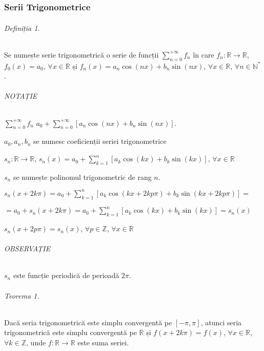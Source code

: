 \part{}
\section{Serii Trigonometrice}
\paragraph{Definiția 1.}
Se numește serie trigonometrică o serie de funcții $\displaystyle\sum_{n=0}^{+\infty}f_{n}$ în care $f_{n}: \mathbb{R} \rightarrow \mathbb{R}$, $f_{0}(x) = a_{0}$, $\forall x \in \mathbb{R}$ și
$f_{n}(x) = a_{n} \cos(nx) + b_{n} \sin(nx)$, $\forall x \in \mathbb{R}$, $\forall n \in \mathbb{N}^{*}$.

\paragraph{NOTAȚIE}
$\displaystyle\sum_{n=0}^{+\infty}f_{n}$  $a_{0} + \displaystyle\sum_{n=0}^{+\infty}[a_{n}\cos(nx) + b_{n}\sin(nx)]$.

$a_{0}, a_{n}, b_{n}$ se numesc coeficienții seriei trigonometrice

$s_{n}:\mathbb{R} \rightarrow \mathbb{R}$, $s_{n}(x) = a_{0} + \displaystyle\sum_{k=1}^{n}[a_{k}\cos(kx) + b_{k}\sin(kx)]$, $\forall x \in \mathbb{R}$

$s_{n}$ se numește polinomul trigonometric de rang $n$.

\vspace{30pt}
$s_{n}(x + 2k\pi) = a_{0} + \displaystyle\sum_{k=1}^{n}[a_{k}\cos(kx + 2kp \pi) + b_{k}\sin(kx+2kp \pi)] = $

$= a_{0} + s_{n}(x + 2k\pi) = a_{0} + \displaystyle\sum_{k=1}^{n}[a_{k}\cos(kx) + b_{k}\sin(kx)] = s_{n}(x)$

$s_{n}(x+2p \pi) = s_{n}(x)$, $\forall p \in \mathbb{Z}$, $\forall x \in \mathbb{R}$

\paragraph{OBSERVAȚIE}
$s_{n}$ este funcție periodică de perioadă $2 \pi$.

\paragraph{Teorema 1.}
Dacă seria trigonometrică este simplu convergentă pe $[-\pi, \pi]$, atunci seria trigonometrică este simplu convergentă pe $\mathbb{R}$ și $f(x+2k\pi) = f(x)$, $\forall x \in \mathbb{R}$,
$\forall k \in \mathbb{Z}$, unde $f:\mathbb{R} \rightarrow \mathbb{R}$ este suma seriei.

